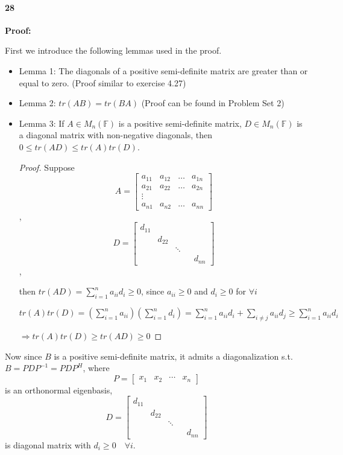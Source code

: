 \documentclass[10pt,letter]{article}
\begin{document}
\paragraph{28}
\textbf{Proof:}

First we introduce the following lemmas used in the proof.

\begin{itemize}
	\item Lemma 1: The diagonals of a positive semi-definite matrix are greater than or equal to zero. (Proof similar to exercise 4.27)
	\item Lemma 2: $tr(AB) = tr(BA)$ (Proof can be found in Problem Set 2)
	\item Lemma 3: If $A \in M_{n}(\mathbb{F})$ is a positive semi-definite matrix, $D \in M_{n}(\mathbb{F})$ is a diagonal matrix with non-negative diagonals, then $0 \leq tr(AD) \leq tr(A)tr(D)$.
	\begin{proof}
		Suppose $$
		A =
		\begin{bmatrix}
		a_{11} & a_{12} & \dots & a_{1n} \\
		a_{21} & a_{22} & \dots & a_{2n} \\
		\vdots   \\
		a_{n1} & a_{n2} &  \dots & a_{nn}
		\end{bmatrix}
		$$, $$
		D =
		\begin{bmatrix}
		d_{11}  \\
		& d_{22} \\
		& & \ddots \\
		& &  & & d_{nn}
		\end{bmatrix}
		$$,

		then $tr(AD) = \sum^{n}_{i=1} a_{ii}d_{i} \geq 0$, since $a_{ii} \geq 0$ and $d_{i} \geq 0$ for $\forall i$

		$tr(A)tr(D) = (\sum^{n}_{i=1} a_{ii})(\sum^{n}_{i=1} d_{i}) = \sum^{n}_{i=1} a_{ii}d_{i} + \sum_{i \neq j} a_{ii}d_{j} \geq \sum^{n}_{i=1} a_{ii}d_{i} $

		$\Rightarrow tr(A)tr(D) \geq tr(AD) \geq 0$
	\end{proof}
\end{itemize}

Now since $B$ is a positive semi-definite matrix, it admits a diagonalization s.t. $B = PDP^{-1}= PDP^{H}$, where $$P = \begin{bmatrix}
x_{1} & x_{2} & \cdots & x_{n}
\end{bmatrix}$$ is an orthonormal eigenbasis,
$$
D =
\begin{bmatrix}
d_{11}  \\
& d_{22} \\
& & \ddots \\
& &  & & d_{nn}
\end{bmatrix}
$$ is diagonal matrix with $d_{i} \geq 0 \quad \forall i$.
\end{document}
